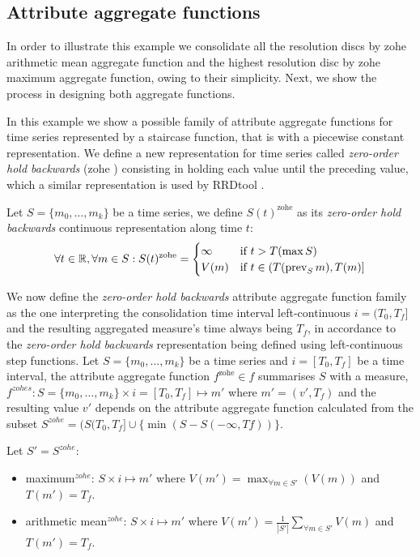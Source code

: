 \subsection{Attribute aggregate functions}

In order to illustrate this example we consolidate all the resolution
discs by zohe arithmetic mean aggregate function and the highest
resolution disc by zohe maximum aggregate function, owing to their
simplicity. Next, we show the process in designing both aggregate
functions.

In this example we show a possible family of attribute aggregate
functions for time series represented by a staircase function, that is
with a piecewise constant representation.  We define a new
representation for time series called \emph{zero-order hold backwards}
(zohe%
) consisting in holding each value until the preceding value, which a
similar representation is used by RRDtool \cite{lisa98:oetiker}.

Let $S=\{m_0,\ldots,m_k\}$ be a time series, we define
$S(t)^{\text{zohe}}$ as its \emph{zero-order hold backwards}
continuous representation along time $t$:
\[
\forall t \in \mathbb{R}  ,\forall m \in S:
S(t)^{\text{zohe}} =  
\begin{cases}
  \infty & \text{if } t > T(\max S) \\%
  V(m) & \text{if }  t\in (T(\prev_S m),T(m)]
\end{cases}
\]


We now define the \emph{zero-order hold backwards} attribute
aggregate function family as the one interpreting the
consolidation time interval left-continuous $i=(T_0,T_f]$ and the
resulting aggregated measure's time always being $T_f$, in
accordance to the \emph{zero-order hold backwards} representation
being defined using left-continuous step functions.  Let
$S=\{m_0,\ldots,m_k\}$ be a time series and $i=[T_0,T_f]$ be a time
interval, the attribute aggregate function $f^{\text{zohe}}\in f$
summarises $S$ with a measure, $f^{zohes}: S=\{m_0,\ldots,m_k\} \times
i=[T_0,T_f] \mapsto m'$ where $m'=(v',T_f)$ and the resulting value
$v'$ depends on the attribute aggregate function calculated from
the subset $S^{zohe}=(S(T_0,T_f] \cup \{\min(S-S(-\infty,Tf))\}$.

Let $S'=S^{zohe}$:
\begin{itemize}
\item maximum$^{zohe}$: $S \times i \mapsto m'$ where $V(m') =
  \max_{\forall m \in S'}(V(m))$ and $T(m')=T_f$.
\item arithmetic mean$^{zohe}$: $S \times i \mapsto m'$ where $V(m')
  = \frac{1}{|S'|} \sum\limits_{\forall m\in S'} V(m)$ and
  $T(m')=T_f$. 
\end{itemize}







